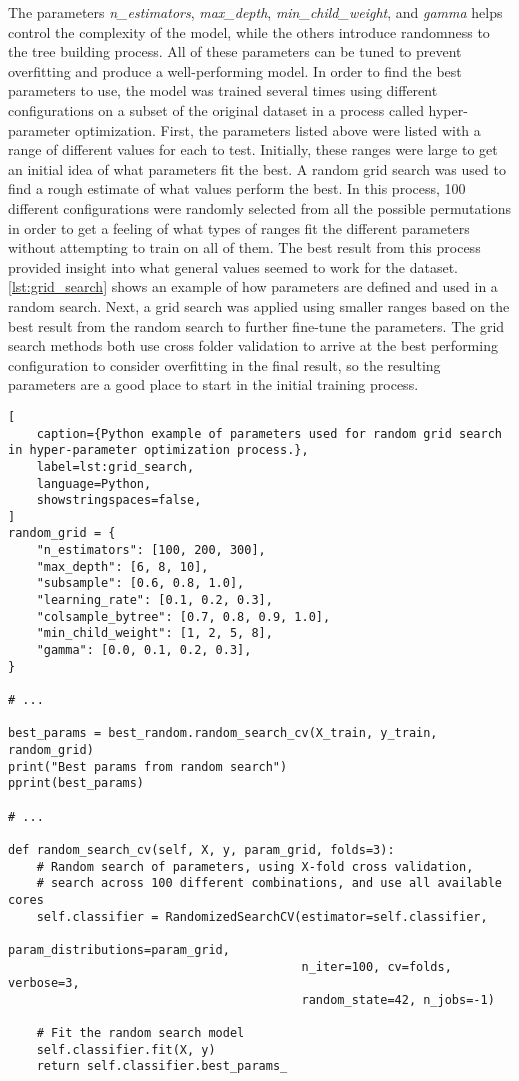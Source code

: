 The parameters \textit{n\_estimators}, \textit{max\_depth}, \textit{min\_child\_weight}, and \textit{gamma} helps control the complexity of the model, while the others introduce randomness to the tree building process. All of these parameters can be tuned to prevent overfitting and produce a well-performing model. In order to find the best parameters to use, the model was trained several times using different configurations on a subset of the original dataset in a process called hyper-parameter optimization. First, the parameters listed above were listed with a range of different values for each to test. Initially, these ranges were large to get an initial idea of what parameters fit the best. A random grid search was used to find a rough estimate of what values perform the best. In this process, 100 different configurations were randomly selected from all the possible permutations in order to get a feeling of what types of ranges fit the different parameters without attempting to train on all of them. The best result from this process provided insight into what general values seemed to work for the dataset. \cref{lst:grid_search} shows an example of how parameters are defined and used in a random search. Next, a grid search was applied using smaller ranges based on the best result from the random search to further fine-tune the parameters. The grid search methods both use cross folder validation to arrive at the best performing configuration to consider overfitting in the final result, so the resulting parameters are a good place to start in the initial training process.

\begin{lstlisting}[
    caption={Python example of parameters used for random grid search in hyper-parameter optimization process.},
    label=lst:grid_search,
    language=Python,
    showstringspaces=false,
]
random_grid = {
    "n_estimators": [100, 200, 300],
    "max_depth": [6, 8, 10],
    "subsample": [0.6, 0.8, 1.0],
    "learning_rate": [0.1, 0.2, 0.3],
    "colsample_bytree": [0.7, 0.8, 0.9, 1.0],
    "min_child_weight": [1, 2, 5, 8],
    "gamma": [0.0, 0.1, 0.2, 0.3],
}

# ...

best_params = best_random.random_search_cv(X_train, y_train, random_grid)
print("Best params from random search")
pprint(best_params)

# ...

def random_search_cv(self, X, y, param_grid, folds=3):
    # Random search of parameters, using X-fold cross validation,
    # search across 100 different combinations, and use all available cores
    self.classifier = RandomizedSearchCV(estimator=self.classifier,
                                         param_distributions=param_grid,
                                         n_iter=100, cv=folds, verbose=3,
                                         random_state=42, n_jobs=-1)

    # Fit the random search model
    self.classifier.fit(X, y)
    return self.classifier.best_params_

\end{lstlisting}


